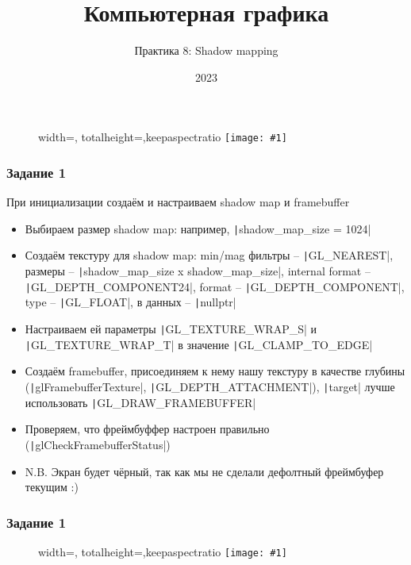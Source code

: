 \documentclass[10pt]{beamer}
\title{Компьютерная графика}
\subtitle{Практика 8: Shadow mapping}
\date{2023}
\newcommand{\slideimage}[1]{
  \begin{figure}
    \begin{adjustbox}{width=\textwidth, totalheight=\textheight-2\baselineskip-2\baselineskip,keepaspectratio}
      \texttt{[image: \#1]}
    \end{adjustbox}
  \end{figure}
}
\begin{document}

\frame{\titlepage}

\begin{frame}[fragile]
\slideimage{0.png}
\end{frame}

\begin{frame}[fragile]
\frametitle{Задание 1}
\begin{footnotesize}
При инициализации создаём и настраиваем shadow map и framebuffer
\begin{itemize}
\item Выбираем размер shadow map: например, \texttt|shadow_map_size = 1024|
\item Создаём текстуру для shadow map: min/mag фильтры -- \texttt|GL_NEAREST|, размеры -- \texttt|shadow_map_size x shadow_map_size|, internal format -- \texttt|GL_DEPTH_COMPONENT24|, format -- \texttt|GL_DEPTH_COMPONENT|, type -- \texttt|GL_FLOAT|, в данных -- \texttt|nullptr|
\item Настраиваем ей параметры \texttt|GL_TEXTURE_WRAP_S| и \texttt|GL_TEXTURE_WRAP_T| в значение \texttt|GL_CLAMP_TO_EDGE|
\item Создаём framebuffer, присоединяем к нему нашу текстуру в качестве глубины (\texttt|glFramebufferTexture|, \texttt|GL_DEPTH_ATTACHMENT|), \texttt|target| лучше использовать \texttt|GL_DRAW_FRAMEBUFFER|
\item Проверяем, что фреймбуффер настроен правильно (\texttt|glCheckFramebufferStatus|)
\item N.B. Экран будет чёрный, так как мы не сделали дефолтный фреймбуфер текущим :)
\end{itemize}
\end{footnotesize}
\end{frame}

\begin{frame}[fragile]
\frametitle{Задание 1}
\slideimage{1.png}
\end{frame}
\end{document}
